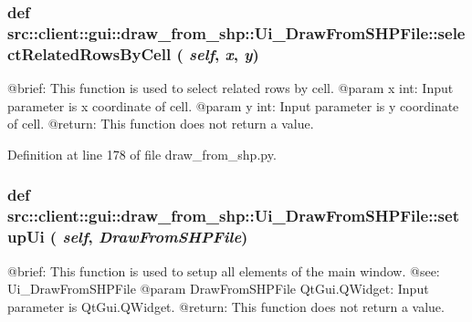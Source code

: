 \hypertarget{classsrc_1_1client_1_1gui_1_1draw__from__shp_1_1Ui__DrawFromSHPFile_aa7aad22defadf11fec1d0eaa7f372a5c}{
\subsubsection[{selectRelatedRowsByCell}]{\setlength{\rightskip}{0pt plus 5cm}def src::client::gui::draw\_\-from\_\-shp::Ui\_\-DrawFromSHPFile::selectRelatedRowsByCell ( {\em self}, \/   {\em x}, \/   {\em y})}}
\label{classsrc_1_1client_1_1gui_1_1draw__from__shp_1_1Ui__DrawFromSHPFile_aa7aad22defadf11fec1d0eaa7f372a5c}
\begin{DoxyVerb}
@brief: This function is used to select related rows by cell.
@param x int: Input parameter is x coordinate of cell.
@param y int: Input parameter is y coordinate of cell. 
@return: This function does not return a value.
\end{DoxyVerb}
 

Definition at line 178 of file draw\_\-from\_\-shp.py.

\hypertarget{classsrc_1_1client_1_1gui_1_1draw__from__shp_1_1Ui__DrawFromSHPFile_af94bc32e90cbcfa8469784ac724b9038}{
\subsubsection[{setupUi}]{\setlength{\rightskip}{0pt plus 5cm}def src::client::gui::draw\_\-from\_\-shp::Ui\_\-DrawFromSHPFile::setupUi ( {\em self}, \/   {\em DrawFromSHPFile})}}
\label{classsrc_1_1client_1_1gui_1_1draw__from__shp_1_1Ui__DrawFromSHPFile_af94bc32e90cbcfa8469784ac724b9038}
\begin{DoxyVerb}
@brief: This function is used to setup all elements of the main window.
@see: Ui_DrawFromSHPFile
@param DrawFromSHPFile QtGui.QWidget: Input parameter is QtGui.QWidget.
@return: This function does not return a value. 
\end{DoxyVerb}
 

